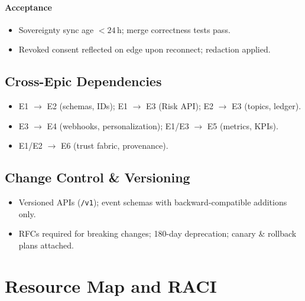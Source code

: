 \documentclass[11pt]{article}
\theoremstyle{plain}
\begin{document}
\paragraph{Acceptance}
\begin{itemize}
  \item Sovereignty sync age $<24$\,h; merge correctness tests pass.
  \item Revoked consent reflected on edge upon reconnect; redaction applied.
\end{itemize}

\subsection{Cross-Epic Dependencies}
\begin{itemize}
  \item E1 $\rightarrow$ E2 (schemas, IDs); E1 $\rightarrow$ E3 (Risk API); E2 $\rightarrow$ E3 (topics, ledger).
  \item E3 $\rightarrow$ E4 (webhooks, personalization); E1/E3 $\rightarrow$ E5 (metrics, KPIs).
  \item E1/E2 $\rightarrow$ E6 (trust fabric, provenance).
\end{itemize}

\subsection{Change Control \& Versioning}
\begin{itemize}
  \item Versioned APIs (\texttt{/v1}); event schemas with backward-compatible additions only.
  \item RFCs required for breaking changes; 180-day deprecation; canary \& rollback plans attached.
\end{itemize}


\section{Resource Map and RACI}
\end{document}
